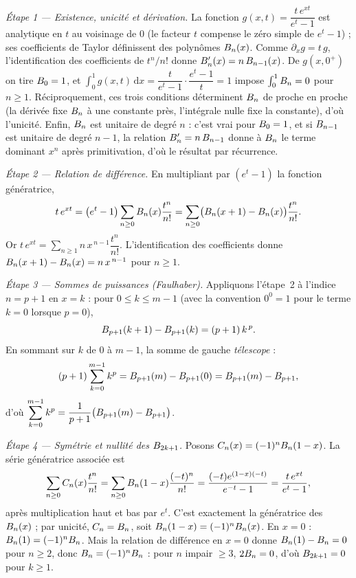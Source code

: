 \begin{mdframed}[style=proofbar]
  \textit{Étape 1 — Existence, unicité et dérivation.}
  La fonction $g(x,t)=\dfrac{t\,e^{xt}}{e^{t}-1}$ est analytique en $t$ au
  voisinage de $0$ (le facteur $t$ compense le zéro simple de $e^{t}-1$) ; ses
  coefficients de Taylor définissent des polynômes $B_{n}(x)$. Comme
  $\partial_{x}g = t\,g$, l'identification des coefficients de $t^{n}/n!$ donne
  $B_{n}'(x)=n\,B_{n-1}(x)$. De $g(x,0^{+})$ on tire $B_{0}=1$, et
  $\int_{0}^{1}g(x,t)\,\mathrm{d}x=\dfrac{t}{e^{t}-1}\cdot\dfrac{e^{t}-1}{t}=1$
  impose $\int_{0}^{1}B_{n}=0$ pour $n\geq 1$. Réciproquement, ces trois
  conditions déterminent $B_{n}$ de proche en proche (la dérivée fixe
  $B_{n}$ à une constante près, l'intégrale nulle fixe la constante), d'où
  l'unicité. Enfin, $B_{n}$ est unitaire de degré $n$ : c'est vrai pour
  $B_{0}=1$, et si $B_{n-1}$ est unitaire de degré $n-1$, la relation
  $B_{n}'=n\,B_{n-1}$ donne à $B_{n}$ le terme dominant $x^{n}$ après
  primitivation, d'où le résultat par récurrence.

  \medskip
  \textit{Étape 2 — Relation de différence.}
  En multipliant par $(e^{t}-1)$ la fonction génératrice,
  \[
    t\,e^{xt}=\bigl(e^{t}-1\bigr)\sum_{n\geq 0}B_{n}(x)\frac{t^{n}}{n!}
    =\sum_{n\geq 0}\bigl(B_{n}(x+1)-B_{n}(x)\bigr)\frac{t^{n}}{n!}.
  \]
  Or $t\,e^{xt}=\sum_{n\geq 1}n\,x^{\,n-1}\dfrac{t^{n}}{n!}$. L'identification des
  coefficients donne $B_{n}(x+1)-B_{n}(x)=n\,x^{\,n-1}$ pour $n\geq 1$.

  \medskip
  \textit{Étape 3 — Sommes de puissances (Faulhaber).}
  Appliquons l'étape~2 à l'indice $n=p+1$ en $x=k$ : pour $0\leq k\leq m-1$
  (avec la convention $0^{0}=1$ pour le terme $k=0$ lorsque $p=0$),
  \[
    B_{p+1}(k+1)-B_{p+1}(k)=(p+1)\,k^{\,p}.
  \]
  En sommant sur $k$ de $0$ à $m-1$, la somme de gauche \emph{télescope} :
  \[
    (p+1)\sum_{k=0}^{m-1}k^{p}
    =B_{p+1}(m)-B_{p+1}(0)
    =B_{p+1}(m)-B_{p+1},
  \]
  d'où $\displaystyle\sum_{k=0}^{m-1}k^{p}=\frac{1}{p+1}\bigl(B_{p+1}(m)-B_{p+1}\bigr)$.

  \medskip
  \textit{Étape 4 — Symétrie et nullité des $B_{2k+1}$.}
  Posons $C_{n}(x)=(-1)^{n}B_{n}(1-x)$. La série génératrice associée est
  \[
    \sum_{n\geq 0}C_{n}(x)\frac{t^{n}}{n!}
    =\sum_{n\geq 0}B_{n}(1-x)\frac{(-t)^{n}}{n!}
    =\frac{(-t)e^{(1-x)(-t)}}{e^{-t}-1}
    =\frac{t\,e^{xt}}{e^{t}-1},
  \]
  après multiplication haut et bas par $e^{t}$. C'est exactement la génératrice
  des $B_{n}(x)$ ; par unicité, $C_{n}=B_{n}$, soit
  $B_{n}(1-x)=(-1)^{n}B_{n}(x)$. En $x=0$ : $B_{n}(1)=(-1)^{n}B_{n}$.
  Mais la relation de différence en $x=0$ donne $B_{n}(1)-B_{n}=0$ pour
  $n\geq 2$, donc $B_{n}=(-1)^{n}B_{n}$ : pour $n$ impair $\geq 3$,
  $2B_{n}=0$, d'où $B_{2k+1}=0$ pour $k\geq 1$.


\end{mdframed}
